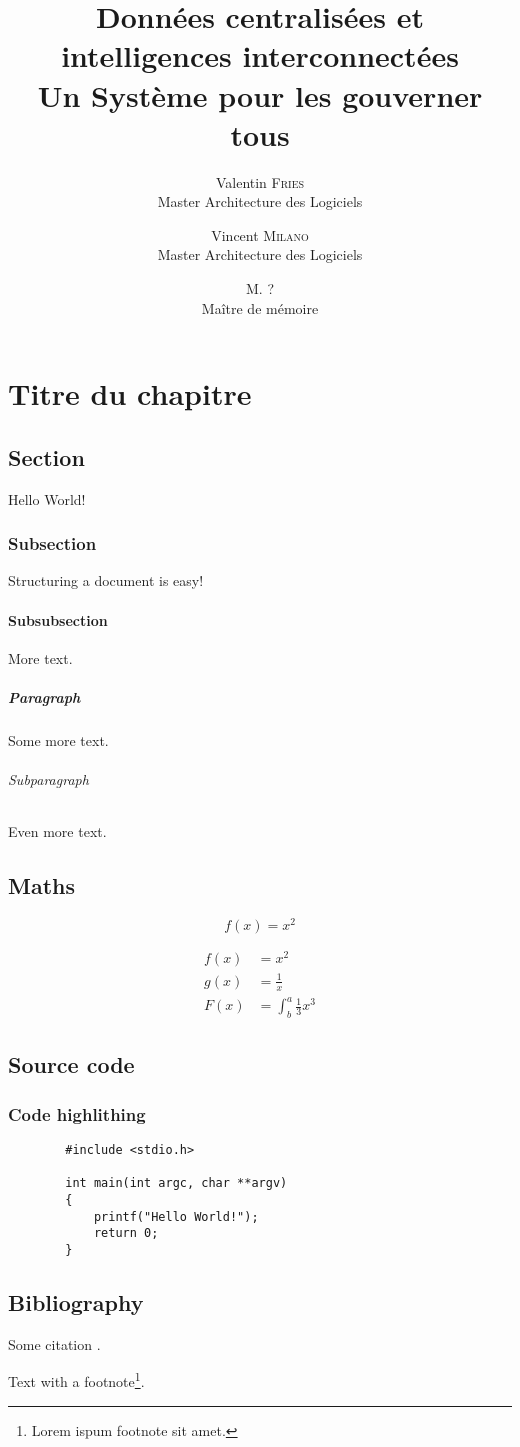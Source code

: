 \documentclass{report}
\title{
    \huge Données centralisées et intelligences interconnectées \\
    \LARGE Un Système pour les gouverner tous
}
\author{
    Valentin \textsc{Fries} \\ Master Architecture des Logiciels 
    \and
    Vincent \textsc{Milano} \\ Master Architecture des Logiciels
    \and
    M. ? \\ Maître de mémoire
}
\begin{document}
\maketitle

\newpage
\tableofcontents

\newpage
{}

\chapter{Titre du chapitre}
\section{Section}
    Hello World!

    \subsection{Subsection}
    Structuring a document is easy!

        \subsubsection{Subsubsection}
        More text.

        \paragraph{Paragraph}
        Some more text.

            \subparagraph{Subparagraph}
            Even more text.

\section{Maths}
   \begin{equation*}
     f(x) = x^2
   \end{equation*}

   \begin{align*}
     f(x) &= x^2\\
     g(x) &= \frac{1}{x}\\
     F(x) &= \int^a_b \frac{1}{3}x^3
   \end{align*}

\section{Source code}
   \subsection{Code highlithing}
   \begin{lstlisting}
        #include <stdio.h>

        int main(int argc, char **argv)
        {
            printf("Hello World!");
            return 0;
        }
   \end{lstlisting}

\section{Bibliography}
    Some citation \cite{Foucault:0}.

    Text with a footnote\footnote{Lorem ispum footnote sit amet.}.

\newpage



\end{document}
